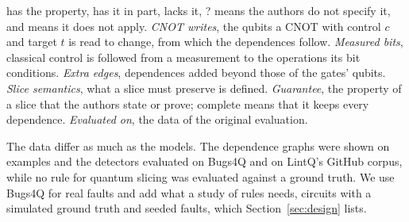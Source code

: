 \begin{table}[t]
\begin{minipage}{\textwidth}
  \full{} has the property, \half{} has it in part, \none{} lacks it, ? means the authors do not specify it, and
  \na{} means it does not apply. \emph{CNOT writes}, the qubits a CNOT with control $c$ and target $t$ is read to
  change, from which the dependences follow. \emph{Measured bits}, classical control is followed from a measurement
  to the operations its bit conditions. \emph{Extra edges}, dependences added beyond those of the gates' qubits.
  \emph{Slice semantics}, what a slice must preserve is defined. \emph{Guarantee}, the property of a slice that the
  authors state or prove; complete means that it keeps every dependence. \emph{Evaluated on}, the data of the original
  evaluation.
  \end{minipage}
\end{table}

The data differ as much as the models. The dependence graphs were shown on examples and the detectors evaluated on
Bugs4Q and on LintQ's GitHub corpus, while no rule for quantum slicing was evaluated against a ground truth. We use
Bugs4Q for real faults and add what a study of rules needs, circuits with a simulated ground truth and seeded faults,
which Section~\ref{sec:design} lists.
